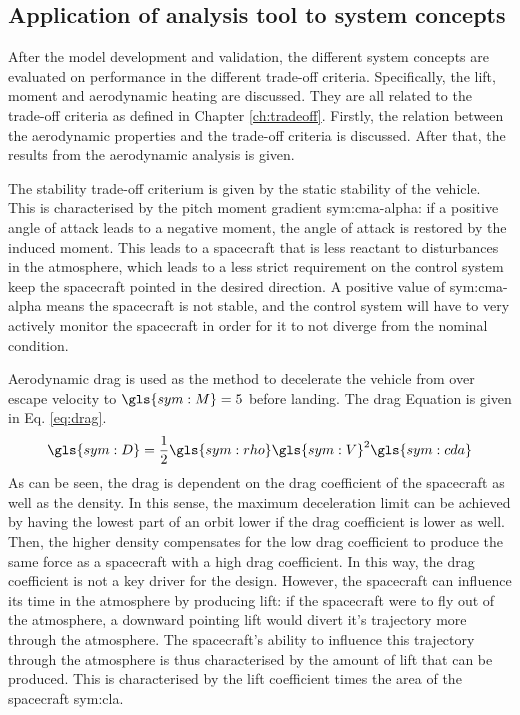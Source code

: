 \subsection{Application of analysis tool to system concepts}
\label{subsec:appaeroanal}
After the model development and validation, the different system concepts are evaluated on performance in the different trade-off criteria. Specifically, the lift, moment and aerodynamic heating are discussed. They are all related to the trade-off criteria as defined in Chapter \ref{ch:tradeoff}. Firstly, the relation between the aerodynamic properties and the trade-off criteria is discussed. After that, the results from the aerodynamic analysis is given.

The stability trade-off criterium is given by the static stability of the vehicle. This is characterised by the pitch moment gradient \gls{sym:cma-alpha}: if a positive angle of attack leads to a negative moment, the angle of attack is restored by the induced moment. This leads to a spacecraft that is less reactant to disturbances in the atmosphere, which leads to a less strict requirement on the control system keep the spacecraft pointed in the desired direction. A positive value of \gls{sym:cma-alpha} means the spacecraft is not stable, and the control system will have to very actively monitor the spacecraft in order for it to not diverge from the nominal condition.

Aerodynamic drag is used as the method to decelerate the vehicle from over escape velocity to $\gls{sym:M}=5$ before landing. The drag Equation is given in Eq. \ref{eq:drag}.
\begin{equation} \label{eq:drag}
\gls{sym:D} = \frac{1}{2}\gls{sym:rho}\gls{sym:V}^2\gls{sym:cda}
\end{equation}
As can be seen, the drag is dependent on the drag coefficient of the spacecraft as well as the density. In this sense, the maximum deceleration limit can be achieved by having the lowest part of an orbit lower if the drag coefficient is lower as well. Then, the higher density compensates for the low drag coefficient to produce the same force as a spacecraft with a high drag coefficient. In this way, the drag coefficient is not a key driver for the design. However, the spacecraft can influence its time in the atmosphere by producing lift: if the spacecraft were to fly out of the atmosphere, a downward pointing lift would divert it's trajectory more through the atmosphere. The spacecraft's ability to influence this trajectory through the atmosphere is thus characterised by the amount of lift that can be produced. This is characterised by the lift coefficient times the area of the spacecraft \gls{sym:cla}.

